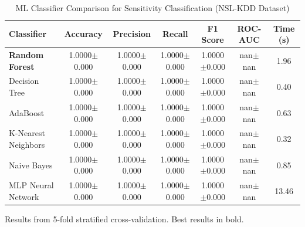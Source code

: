 
\begin{table}[htbp]
\centering
\caption{ML Classifier Comparison for Sensitivity Classification (NSL-KDD Dataset)}
\label{tab:ml_ablation}
\begin{tabular}{lcccccc}
\toprule
\textbf{Classifier} & \textbf{Accuracy} & \textbf{Precision} & \textbf{Recall} & \textbf{F1 Score} & \textbf{ROC-AUC} & \textbf{Time (s)} \\
\midrule
\textbf{Random Forest} & 1.0000$\pm$0.000 & 1.0000$\pm$0.000 & 1.0000$\pm$0.000 & 1.0000$\pm$0.000 & nan$\pm$nan & 1.96 \\
Decision Tree & 1.0000$\pm$0.000 & 1.0000$\pm$0.000 & 1.0000$\pm$0.000 & 1.0000$\pm$0.000 & nan$\pm$nan & 0.40 \\
AdaBoost & 1.0000$\pm$0.000 & 1.0000$\pm$0.000 & 1.0000$\pm$0.000 & 1.0000$\pm$0.000 & nan$\pm$nan & 0.63 \\
K-Nearest Neighbors & 1.0000$\pm$0.000 & 1.0000$\pm$0.000 & 1.0000$\pm$0.000 & 1.0000$\pm$0.000 & nan$\pm$nan & 0.32 \\
Naive Bayes & 1.0000$\pm$0.000 & 1.0000$\pm$0.000 & 1.0000$\pm$0.000 & 1.0000$\pm$0.000 & nan$\pm$nan & 0.85 \\
MLP Neural Network & 1.0000$\pm$0.000 & 1.0000$\pm$0.000 & 1.0000$\pm$0.000 & 1.0000$\pm$0.000 & nan$\pm$nan & 13.46 \\
\bottomrule
\end{tabular}
\begin{tablenotes}
\small
\item Results from 5-fold stratified cross-validation. Best results in bold.
\end{tablenotes}
\end{table}
